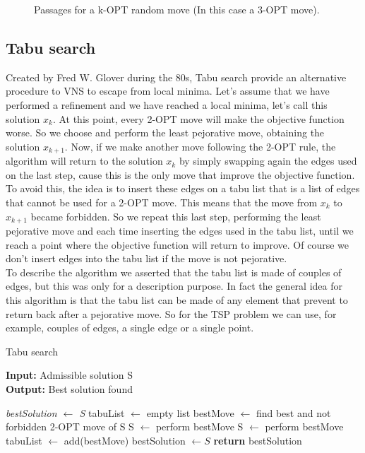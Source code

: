 \begin{figure}[h!]
\begin{subfigure}[b]{0.49\linewidth}
    \caption{}
  \end{subfigure}
  \caption{Passages for a k-OPT random move (In this case a 3-OPT move).}
\end{figure}


\subsection{Tabu search}
Created by Fred W. Glover during the 80s, Tabu search provide an alternative procedure to VNS to escape from local minima. Let's assume that we have performed a refinement and we have reached a local minima, let's call this solution $x_k$. At this point, every 2-OPT move will make the objective function worse. So we choose and perform the least pejorative move, obtaining the solution $x_{k+1}$. Now, if we make another move following the 2-OPT rule, the algorithm will return to the solution $x_{k}$ by simply swapping again the edges used on the last step, cause this is the only move that improve the objective function. To avoid this, the idea is to insert these edges on a tabu list that is a list of edges that cannot be used for a 2-OPT move. This means that the move from $x_{k}$ to $x_{k+1}$ became forbidden. So we repeat this last step, performing the least pejorative move and each time inserting the edges used in the tabu list, until we reach a point where the objective function will return to improve. Of course we don't insert edges into the tabu list if the move is not pejorative. \\
To describe the algorithm we asserted that the tabu list is made of couples of edges, but this was only for a description purpose. In fact the general idea for this algorithm is that the tabu list can be made of any element that prevent to return back after a pejorative move. So for the TSP problem we can use, for example, couples of edges, a single edge or a single point. \\

\begin{algorithm}
	\caption{Tabu search}\label{TabuSearch method}
	\hspace*{\algorithmicindent} \textbf{Input:} Admissible solution S \\
	\hspace*{\algorithmicindent} \textbf{Output:} Best solution found
    \begin{algorithmic}[1]
    		\State \textit{bestSolution $\leftarrow$ S}
				\State tabuList $\leftarrow$ empty list
			\EndIf
			\State bestMove $\leftarrow$ find best and not forbidden 2-OPT move of S
				\State S $\leftarrow$ perform bestMove
			\Else
				\State S $\leftarrow$ perform bestMove
				\State tabuList $\leftarrow$ add(bestMove)
			\EndIf
				\State bestSolution $\leftarrow S$
			\EndIf
		\EndWhile
		\State \textbf{return} bestSolution
    \end{algorithmic}
\end{algorithm}

